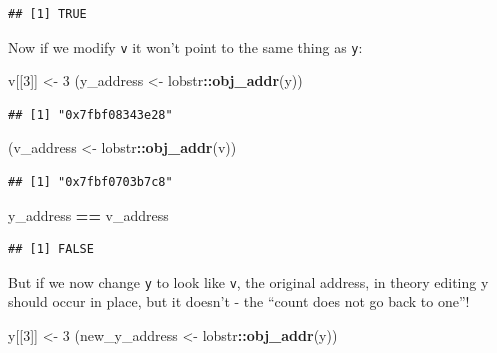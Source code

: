 \documentclass[]{book}
\newenvironment{Shaded}{\begin{snugshade}}{\end{snugshade}}
\newcommand{\DecValTok}[1]{\textcolor[rgb]{0.00,0.00,0.81}{#1}}
\newcommand{\KeywordTok}[1]{\textcolor[rgb]{0.13,0.29,0.53}{\textbf{#1}}}
\newcommand{\NormalTok}[1]{#1}
\newcommand{\OperatorTok}[1]{\textcolor[rgb]{0.81,0.36,0.00}{\textbf{#1}}}
\newcommand{\StringTok}[1]{\textcolor[rgb]{0.31,0.60,0.02}{#1}}
\begin{document}
\begin{verbatim}
## [1] TRUE
\end{verbatim}

Now if we modify \texttt{v} it won't point to the same thing as \texttt{y}:

\begin{Shaded}
\begin{Highlighting}[]
\NormalTok{v[[}\DecValTok{3}\NormalTok{]] <-}\StringTok{ }\DecValTok{3}
\NormalTok{(y_address <-}\StringTok{ }\NormalTok{lobstr}\OperatorTok{::}\KeywordTok{obj_addr}\NormalTok{(y))}
\end{Highlighting}
\end{Shaded}

\begin{verbatim}
## [1] "0x7fbf08343e28"
\end{verbatim}

\begin{Shaded}
\begin{Highlighting}[]
\NormalTok{(v_address <-}\StringTok{ }\NormalTok{lobstr}\OperatorTok{::}\KeywordTok{obj_addr}\NormalTok{(v))}
\end{Highlighting}
\end{Shaded}

\begin{verbatim}
## [1] "0x7fbf0703b7c8"
\end{verbatim}

\begin{Shaded}
\begin{Highlighting}[]
\NormalTok{y_address }\OperatorTok{==}\StringTok{ }\NormalTok{v_address}
\end{Highlighting}
\end{Shaded}

\begin{verbatim}
## [1] FALSE
\end{verbatim}

But if we now change \texttt{y} to look like \texttt{v}, the original address, in theory editing y should occur in place, but it doesn't - the ``count does not go back to one''!

\begin{Shaded}
\begin{Highlighting}[]
\NormalTok{y[[}\DecValTok{3}\NormalTok{]] <-}\StringTok{ }\DecValTok{3}
\NormalTok{(new_y_address <-}\StringTok{ }\NormalTok{lobstr}\OperatorTok{::}\KeywordTok{obj_addr}\NormalTok{(y))}
\end{Highlighting}
\end{Shaded}
\end{document}
